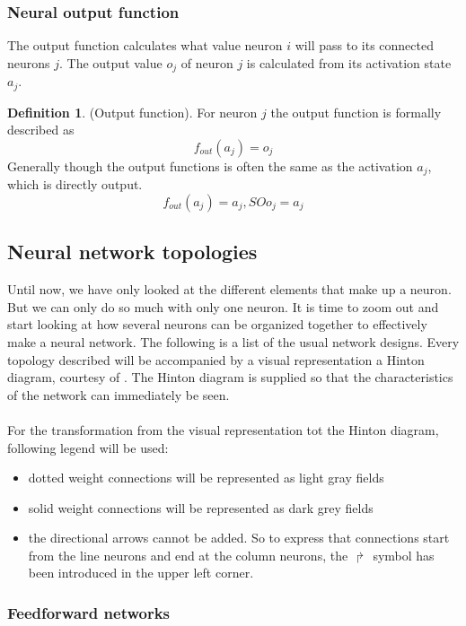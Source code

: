 \documentclass[pdftex,a4paper,12pt,twoside]{report}
\theoremstyle{plain} \newtheorem{theorem}{Theorem} \newtheorem{proposition}{Proposition} \newtheorem{lemma}{Lemma} \newtheorem*{corollary}{Corollary}
\theoremstyle{definition} \newtheorem{definition}{Definition} \newtheorem{conjecture}{Conjecture} \newtheorem*{example}{Example} \newtheorem{algorithm}{Algorithm}
\theoremstyle{remark} \newtheorem*{remark}{Remark} \newtheorem*{note}{Note} \newtheorem{case}{Case}
\begin{document}
\subsubsection{Neural output function}
The output function calculates what value neuron $i$ will pass to its connected neurons $j$. The output value $o_j$  of neuron $j$ is calculated from its activation state $a_j$.
\begin{definition}
(Output function). For neuron $j$ the output function is formally described as
\begin{equation}
f _{out}(a_j) = o_j
\end{equation}
Generally though the output functions is often the same as the activation $a_j$, which is directly output.
\begin{equation}
f _{out}(a_j) = a_j,SO o_j = a_j
\end{equation}
\end{definition}
\subsection{Neural network topologies}
Until now, we have only looked at the different elements that make up a neuron. But we can only do so much with only one neuron. It is time to zoom out and start looking at how several neurons can be organized together to effectively make a neural network. The following is a list of the usual network designs. Every topology described will be accompanied by a visual representation a Hinton diagram, courtesy of \citep{Kriesel2013}. The Hinton diagram is supplied so that the characteristics of the network can immediately be seen.\\\\For the transformation from the visual representation tot the Hinton diagram, following legend will be used:
\begin{itemize}
\item dotted weight connections will be represented as light gray fields
\item solid weight connections will be represented as dark grey fields
\item the directional arrows cannot be added. So to express that connections start from the line neurons and end at the column neurons, the $\Rsh$ symbol has been introduced in the upper left corner.
\end{itemize}
\subsubsection{Feedforward networks}
\end{document}
